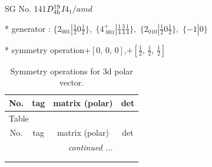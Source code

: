 \documentclass[fleqn,8pt]{jsarticle}
\begin{document}
\setcounter{MaxMatrixCols}{32}

\renewcommand{\tablename}{Table~}
\renewcommand{\figurename}{Figure~}
\begin{center}
\LARGE
SG No. 141\quad$D_{\rm 4h}^{19}$\quad$I4_1/amd$\quad[ tetragonal ]
\end{center}

* generator : $\{2{}_{001}|\frac{1}{2} 0 \frac{1}{2}\},\,\,\{4^{+}_{\,\,001}|\frac{1}{4} \frac{3}{4} \frac{1}{4}\},\,\,\{2{}_{010}|\frac{1}{2} 0 \frac{1}{2}\},\,\,\{-1|0\}$

* symmetry operation\quad$+\left[ 0,\, 0,\, 0 \right]$,\quad $+\left[ \frac{1}{2},\, \frac{1}{2},\, \frac{1}{2} \right]$
\renewcommand{\arraystretch}{1.3}
\begin{longtable}{cccc}
\caption{Symmetry operations for 3d polar vector.}
 \\
 \hline \hline
No. & tag & matrix (polar) & det \\ \hline \endfirsthead

\multicolumn{3}{l}{\tablename\ \thetable{}} \\
 \hline \hline
No. & tag & matrix (polar) & det \\ \hline \endhead

 \hline \hline
\multicolumn{3}{r}{\footnotesize\it continued ...} \\ \endfoot

 \hline \hline
\multicolumn{3}{r}{} \\ \endlastfoot


\end{longtable}
\end{document}
